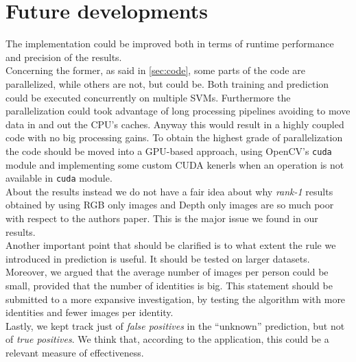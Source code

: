 \documentclass{article}
\begin{document}
\section{Future developments}
The implementation could be improved both in terms of runtime performance and precision of the results. \\
Concerning the former, as said in \ref{sec:code}, some parts of the code are parallelized, while others are not, but could be. Both training and prediction could be executed concurrently on multiple SVMs. Furthermore the parallelization could took advantage of long processing pipelines avoiding to move data in and out the CPU's caches. Anyway this would result in a highly coupled code with no big processing gains. To obtain the highest grade of parallelization the code should be moved into a GPU-based approach, using OpenCV's \verb|cuda| module and implementing some custom CUDA kenerls when an operation is not available in \verb|cuda| module. \\
About the results instead we do not have a fair idea about why \textit{rank-1} results obtained by using RGB only images and Depth only images are so much poor with respect to the authors paper. This is the major issue we found in our results. \\
Another important point that should be clarified is to what extent the rule we introduced in prediction is useful. It should be tested on larger datasets. Moreover, we argued that the average number of images per person could be small, provided that the number of identities is big. This statement should be submitted to a more expansive investigation, by testing the algorithm with more identities and fewer images per identity. \\
Lastly, we kept track just of \textit{false positives} in the ``unknown'' prediction, but not of \textit{true positives}. We think that, according to the application, this could be a relevant measure of effectiveness.


\printbibliography
\end{document}
